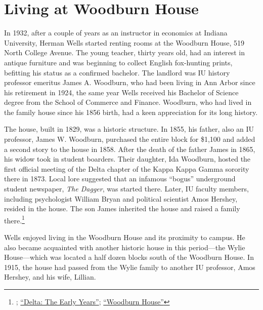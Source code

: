 \documentclass[
  american,
  letterpaper,
]{scrreprt}
\begin{document}
\section{Living at Woodburn House}\label{living-at-woodburn-house}

In 1932, after a couple of years as an instructor in economics at
Indiana University, Herman Wells started renting rooms at the Woodburn
House, 519 North College Avenue. The young teacher, thirty years old,
had an interest in antique furniture and was beginning to collect
English fox-hunting prints, befitting his status as a confirmed
bachelor. The landlord was IU history professor emeritus James A.
Woodburn, who had been living in Ann Arbor since his retirement in 1924,
the same year Wells received his Bachelor of Science degree from the
School of Commerce and Finance. Woodburn, who had lived in the family
house since his 1856 birth, had a keen appreciation for its long
history.

The house, built in 1829, was a historic structure. In 1855, his father,
also an IU professor, James W. Woodburn, purchased the entire block for
\$1,100 and added a second story to the house in 1858. After the death
of the father James in 1865, his widow took in student boarders. Their
daughter, Ida Woodburn, hosted the first official meeting of the Delta
chapter of the Kappa Kappa Gamma sorority there in 1873. Local lore
suggested that an infamous ``bogus'' underground student newspaper,
\emph{The Dagger}, was started there. Later, IU faculty members,
including psychologist William Bryan and political scientist Amos
Hershey, resided in the house. The son James inherited the house and
raised a family there.\footnote{;
  \href{https://wiki.kkg.org/index.php/Delta\#The_Early_Years}{``Delta:
  The Early Years''};
  \href{https://bloomingpedia.org/wiki/Woodburn_House}{``Woodburn
  House''}}

Wells enjoyed living in the Woodburn House and its proximity to campus.
He also became acquainted with another historic house in this
period---the Wylie House---which was located a half dozen blocks south
of the Woodburn House. In 1915, the house had passed from the Wylie
family to another IU professor, Amos Hershey, and his wife, Lillian.
\end{document}
